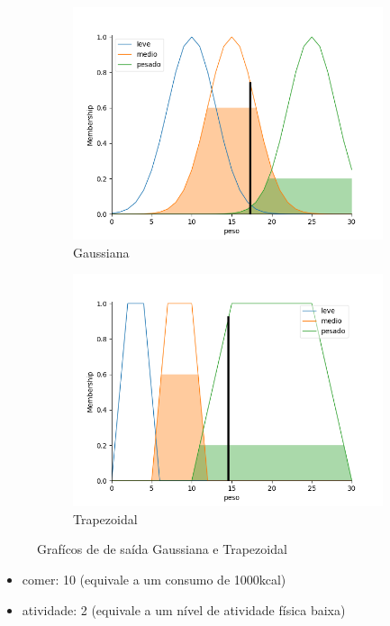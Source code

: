 \documentclass{article}
\begin{document}
\begin{figure}[h!]
  \centering
  \begin{subfigure}[b]{0.4\linewidth}
    \includegraphics[width=\linewidth]{./images/peso-medio.png}
    \caption{Gaussiana}
  \end{subfigure}
  \begin{subfigure}[b]{0.4\linewidth}
    \includegraphics[width=\linewidth]{./images/peso-medio-trap.png}
    \caption{Trapezoidal}
  \end{subfigure}
  \caption{Grafícos de de saída Gaussiana e Trapezoidal}
  \label{fig:saida-1}
\end{figure}

\begin{itemize}
  \item comer: 10 (equivale a um consumo de 1000kcal)
  \item atividade: 2 (equivale a um nível de atividade física baixa)
\end{itemize}
\end{document}
